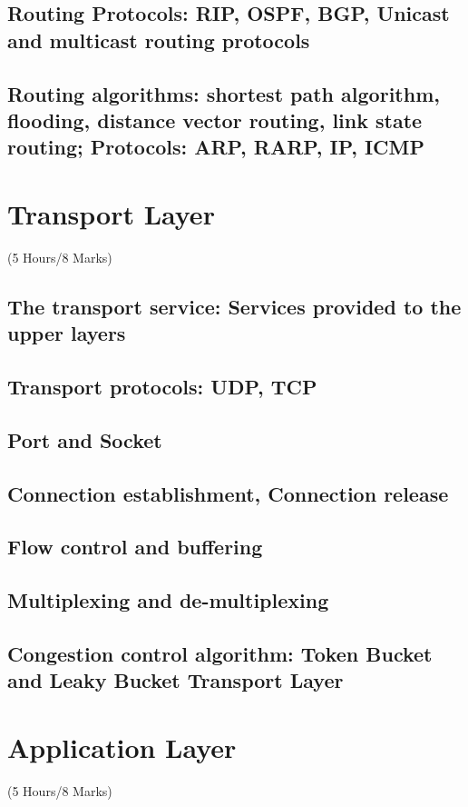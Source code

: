 \documentclass[12pt]{article}
\begin{document}
	\subsection{Routing Protocols: RIP, OSPF, BGP, Unicast and multicast routing protocols}
	\subsection{Routing algorithms: shortest path algorithm, flooding, distance vector routing, link state routing; Protocols: ARP, RARP, IP, ICMP}

	\pagebreak
\section{Transport Layer}
	\begin{center}(5 Hours/8 Marks)\end{center}
	\subsection{The transport service: Services provided to the upper layers}
	\subsection{Transport protocols: UDP, TCP}
	\subsection{Port and Socket}
	\subsection{Connection establishment, Connection release}
	\subsection{Flow control and buffering}
	\subsection{Multiplexing and de-multiplexing}
	\subsection{Congestion control algorithm: Token Bucket and Leaky Bucket Transport Layer}

	\pagebreak

\section{Application Layer}
	\begin{center}(5 Hours/8 Marks)\end{center}
\end{document}
